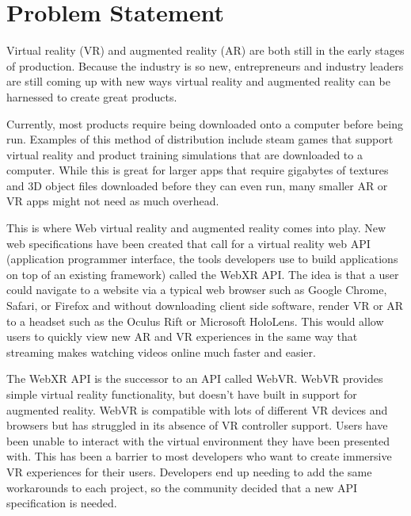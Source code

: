 \section{Problem Statement}
\label{sec:problemStatement}
Virtual reality (VR) and augmented reality (AR) are both still in the early stages of production. Because the industry is so new, entrepreneurs and industry leaders are still coming up with new ways virtual reality and augmented reality can be harnessed to create great products.

Currently, most products require being downloaded onto a computer before being run. Examples of this method of distribution include steam games that support virtual reality and product training simulations that are downloaded to a computer. While this is great for larger apps that require gigabytes of textures and 3D object files downloaded before they can even run, many smaller AR or VR apps might not need as much overhead. 

This is where Web virtual reality and augmented reality comes into play. New web specifications have been created that call for a virtual reality web API (application programmer interface, the tools developers use to build applications on top of an existing framework) called the WebXR API. The idea is that a user could navigate to a website via a typical web browser such as Google Chrome, Safari, or Firefox and without downloading client side software, render VR or AR to a headset such as the Oculus Rift or Microsoft HoloLens. This would allow users to quickly view new AR and VR experiences in the same way that streaming makes watching videos online much faster and easier.

The WebXR API is the successor to an API called WebVR. WebVR provides simple virtual reality functionality, but doesn't have built in support for augmented reality. WebVR is compatible with lots of different VR devices and browsers but has struggled in its absence of VR controller support. Users have been unable to interact with the virtual environment they have been presented with. This has been a barrier to most developers who want to create immersive VR experiences for their users. Developers end up needing to add the same workarounds to each project, so the community decided that a new API specification is needed. 

